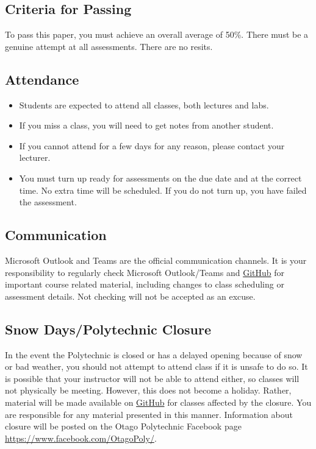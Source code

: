 \documentclass{article}
\begin{document}
\subsection*{Criteria for Passing}
To pass this paper, you must achieve an overall average of 50\%. There must be a genuine attempt at all assessments. There are no resits.

\subsection*{Attendance}
\begin{itemize}
  \item Students are expected to attend all classes, both lectures and labs.
  \item If you miss a class, you will need to get notes from another student.
  \item If you cannot attend for a few days for any reason, please contact your lecturer.
  \item You must turn up ready for assessments on the due date and at the correct time. No extra time will be scheduled. If you do not turn up, you have failed the assessment.
\end{itemize}

\subsection*{Communication}
Microsoft Outlook and Teams are the official communication channels. It is your responsibility to regularly check Microsoft Outlook/Teams and \href{https://github.com/Grayson-Orr/Course-Files}{GitHub} for important course related material, including changes to class scheduling or assessment details. Not checking will not be accepted as an excuse.

\subsection*{Snow Days/Polytechnic Closure}
In the event the Polytechnic is closed or has a delayed opening because of snow or bad weather, you should not attempt to attend class if it is unsafe to do so. It is possible that your instructor will not be able to attend either, so classes will not physically be meeting. However, this does not become a holiday. Rather, material will be made available on \href{https://github.com/Grayson-Orr/Course-Files}{GitHub} for classes affected by the closure. You are responsible for any material presented in this manner. Information about closure will be posted on the Otago Polytechnic Facebook page \href{https://www.facebook.com/OtagoPoly/}{https://www.facebook.com/OtagoPoly/}.
\end{document}
